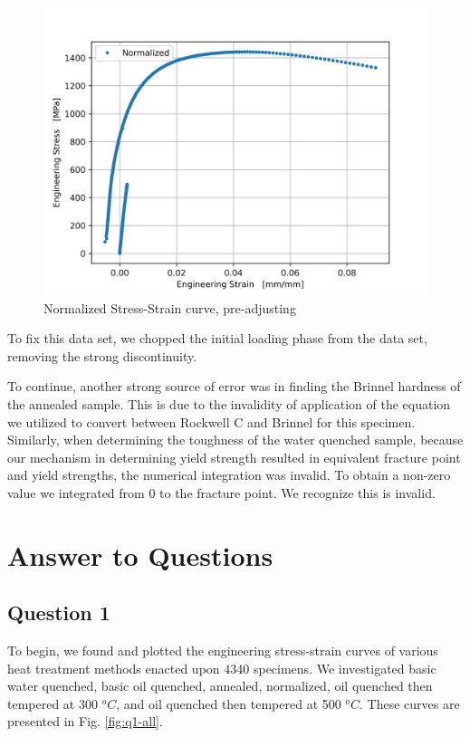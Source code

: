 \documentclass{article}
\begin{document}
\begin{figure}[!h!]
    \centering
    \includegraphics[width=0.5\linewidth]{plots/bs_plot.png}
    \caption{Normalized Stress-Strain curve, pre-adjusting}
    \label{fig:bs-plot}
\end{figure}

To fix this data set, we chopped the initial loading phase from the data set, removing the strong discontinuity. 

To continue, another strong source of error was in finding the Brinnel hardness of the annealed sample. This is due to the invalidity of application of the equation we utilized to convert between Rockwell C and Brinnel for this specimen. Similarly, when determining the toughness of the water quenched sample, because our mechanism in determining yield strength resulted in equivalent fracture point and yield strengths, the numerical integration was invalid. To obtain a non-zero value we integrated from 0 to the fracture point. We recognize this is invalid. 


\newpage
\section{Answer to Questions}
\subsection*{Question 1}
To begin, we found and plotted the engineering stress-strain curves of various heat treatment methods enacted upon 4340 specimens. We investigated basic water quenched, basic oil quenched, annealed, normalized, oil quenched then tempered at 300 $^oC$, and oil quenched then tempered at 500 $^oC$. These curves are presented in Fig. \ref{fig:q1-all}.
\end{document}
